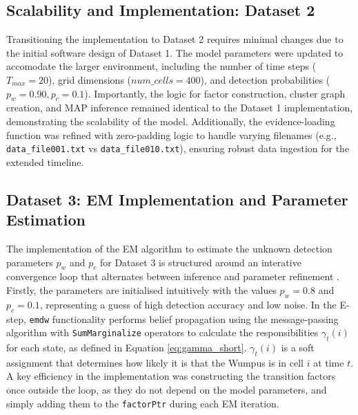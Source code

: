 \documentclass[10pt]{article}
\begin{document}
\subsection{Scalability and Implementation: Dataset 2}
Transitioning the implementation to Dataset 2 requires minimal changes due to the initial software design of Dataset 1. The model parameters were updated to 
accomodate the larger environment, including the number of time steps ($T_{max}=20$), grid dimensions ($num\_cells=400$), and detection probabilities ($p_w=0.90, p_c=0.1$).
Importantly, the logic for factor construction, cluster graph creation, and MAP inference remained identical to the Dataset 1 implementation, 
demonstrating the scalability of the model. Additionally, the evidence-loading function was refined with zero-padding logic to handle varying filenames (e.g., \texttt{data\_file001.txt} vs \texttt{data\_file010.txt}), 
ensuring robust data ingestion for the extended timeline.

\subsection{Dataset 3: EM Implementation and Parameter Estimation}
\label{sec:EM}
The implementation of the EM algorithm to estimate the unknown detection parameters $p_w$ and $p_c$ for Dataset 3 is structured 
around an interative convergence loop that alternates between inference and parameter refinement \cite{dupreez2026PARAM}. 
Firstly, the parameters are initialised intuitively with the values $p_w = 0.8$ and $p_c = 0.1$, representing a guess of high detection accuracy and low noise.
In the E-step, \texttt{emdw} functionality performs belief propagation using the message-passing algorithm with \texttt{SumMarginalize} operators to calculate 
the responsibilities $\gamma_t(i)$ for each state, as defined in Equation \ref{eq:gamma_short}. $\gamma_t(i)$ is a soft assignment that determines how likely 
it is that the Wumpus is in cell $i$ at time $t$. A key efficiency in the implementation was constructing the transition factors once outside the loop, as they do not depend on the model parameters, 
and simply adding them to the \texttt{factorPtr} during each EM iteration.
\end{document}
